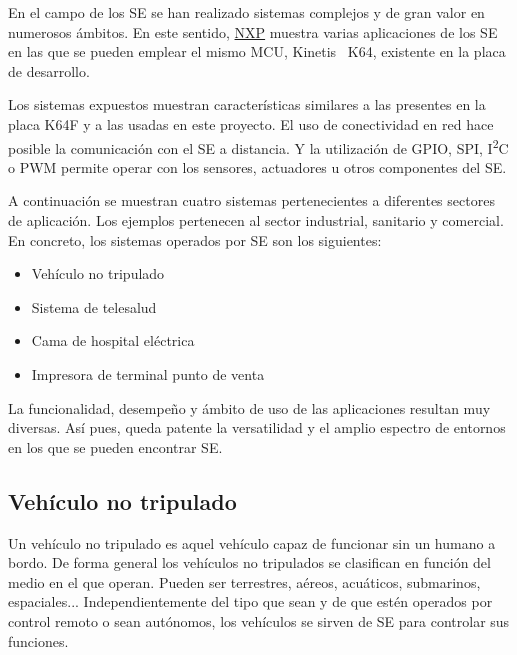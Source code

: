 En el campo de los SE se han realizado sistemas complejos y de gran valor en 
numerosos ámbitos. En este sentido, \href{https://www.nxp.com/products/processors-and-microcontrollers/arm-based-processors-and-mcus/kinetis-cortex-m-mcus/k-seriesperformancem4/k6x-ethernet/kinetis-k64-120-mhz-256kb-sram-microcontrollers-mcus-based-on-arm-cortex-m4-core:K64_120}
{NXP} muestra varias aplicaciones de los SE en las que se pueden emplear el
mismo MCU, Kinetis~\textsuperscript{\tiny\textregistered} K64, existente en la
placa de desarrollo.

Los sistemas expuestos muestran características similares a las presentes en la
placa K64F y a las usadas en este proyecto. El uso de conectividad en red hace
posible la comunicación con el SE a distancia. Y la utilización de GPIO, SPI,
I\textsuperscript{2}C o PWM permite operar con los sensores, actuadores u otros
componentes del SE.

A continuación se muestran cuatro sistemas pertenecientes a diferentes sectores
de aplicación. Los ejemplos pertenecen al sector industrial, sanitario y
comercial. En concreto, los sistemas operados por SE son los siguientes:

\begin{itemize}
  \item Vehículo no tripulado
  \item Sistema de telesalud
  \item Cama de hospital eléctrica
  \item Impresora de terminal punto de venta
\end{itemize}

La funcionalidad, desempeño y ámbito de uso de las aplicaciones resultan muy
diversas. Así pues, queda patente la versatilidad y el amplio espectro de
entornos en los que se pueden encontrar SE.

\subsection{Vehículo no tripulado}{\label{sec:uv}}
Un vehículo no tripulado es aquel vehículo capaz de funcionar sin un humano a
bordo. De forma general los vehículos no tripulados se clasifican en función del
medio en el que operan. Pueden ser terrestres, aéreos, acuáticos, submarinos,
espaciales... Independientemente del tipo que sean y de que estén operados por
control remoto o sean autónomos, los vehículos se sirven de SE para controlar
sus funciones.

